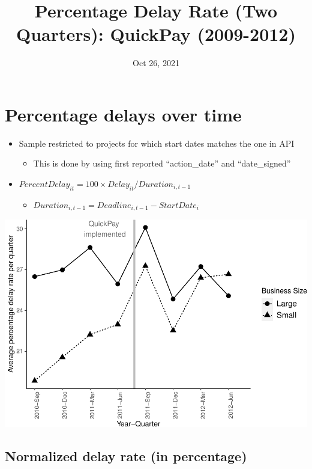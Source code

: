 \documentclass[
]{article}
\title{Percentage Delay Rate (Two Quarters): QuickPay (2009-2012)}
\author{}
\date{\vspace{-2.5em}Oct 26, 2021}
\providecommand{\tightlist}{%
  \setlength{\itemsep}{0pt}\setlength{\parskip}{0pt}}
\begin{document}
\maketitle

\hypertarget{percentage-delays-over-time}{%
\section{Percentage delays over
time}\label{percentage-delays-over-time}}

\begin{itemize}
\tightlist
\item
  Sample restricted to projects for which start dates matches the one in
  API

  \begin{itemize}
  \tightlist
  \item
    This is done by using first reported ``action\_date'' and
    ``date\_signed''
  \end{itemize}
\item
  \(PercentDelay_{it}=100 \times Delay_{it}/Duration_{i,t-1}\)

  \begin{itemize}
  \tightlist
  \item
    \(Duration_{i,t-1} = Deadline_{i,t-1} - StartDate_i\)
  \end{itemize}
\end{itemize}

\includegraphics{qp_first_pc_delay_three_quarters_files/figure-latex/plot_pc_delay-1.pdf}

\hypertarget{normalized-delay-rate-in-percentage}{%
\subsection{Normalized delay rate (in
percentage)}\label{normalized-delay-rate-in-percentage}}
\end{document}
